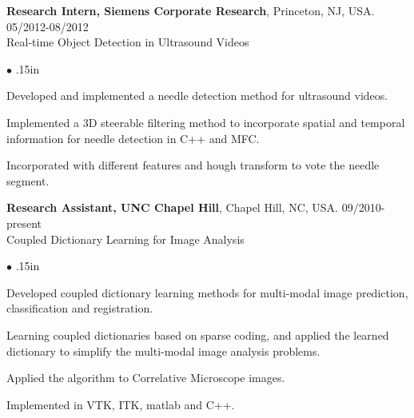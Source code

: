 \documentclass[line,margin]{res}
\newenvironment{bullets}{\begin{list}{\tiny$\bullet$}{\topsep 0pt \itemsep -2pt \leftmargin .15in}}{\vspace*{4pt}\end{list}}
\begin{document}
\begin{resume}
\textbf{Research Intern, Siemens Corporate Research}, Princeton, NJ, USA. \hfill      05/2012-08/2012 \\
Real-time Object Detection in Ultrasound Videos
\begin{bullets} 
\item Developed and implemented a needle detection method for ultrasound videos. 
\item Implemented a 3D steerable filtering method to incorporate spatial and temporal information for needle detection in C++ and MFC.
\item Incorporated with different features and hough transform to vote the needle segment.
\end{bullets}
\vspace{-.1in}

\textbf{Research Assistant, UNC Chapel Hill}, Chapel Hill, NC, USA.  \hfill      09/2010-present \\
Coupled Dictionary Learning for Image Analysis %
\begin{bullets}
\item Developed coupled dictionary learning methods for multi-modal image prediction, classification and registration.
\item Learning coupled dictionaries based on sparse coding, and applied the learned dictionary to simplify the multi-modal image analysis problems.
\item Applied the algorithm to Correlative Microscope images.
\item Implemented in VTK, ITK, matlab and C++.
\end{bullets}
\vspace{-.1in}


\end{resume}
\end{document}
